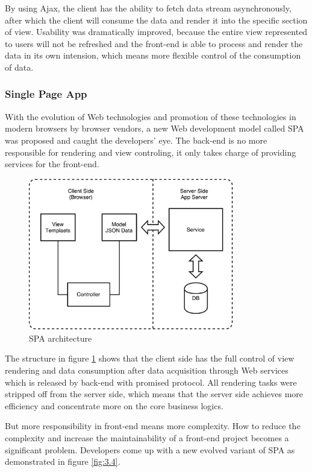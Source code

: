 By using Ajax, the client has the ability to fetch data stream asynchronously, after which the client will consume the data and render it into the specific section of view. Usability was dramatically improved, because the entire view represented to users will not be refreshed and the front-end is able to process and render the data in its own intension, which means more flexible control of the consumption of data.

\subsubsection{Single Page App}

With the evolution of Web technologies and promotion of these technologies in modern browsers by browser vendors, a new Web development model called \gls{SPA} was proposed and caught the developers' eye. The back-end is no more responsible for rendering and view controling, it only takes charge of providing services for the front-end.

\begin{figure}[!htbp]
  \centering
    \includegraphics[width=0.8\textwidth]{Figures/tech-Web-arch-spa.pdf}
  \caption{SPA architecture}
  \label{fig:3.3}
\end{figure}

The structure in figure \ref{fig:3.3} shows that the client side has the full control of view rendering and data consumption after data acquisition through Web services which is released by back-end with promised protocol. All rendering tasks were stripped off from the server side, which means that the server side achieves more efficiency and concentrate more on the core business logics\cite{brandon2008software}.

But more responsibility in front-end means more complexity. How to reduce the complexity and increase the maintainability of a front-end project becomes a significant problem. Developers come up with a new evolved variant of SPA as demonstrated in figure \ref{fig:3.4}.

